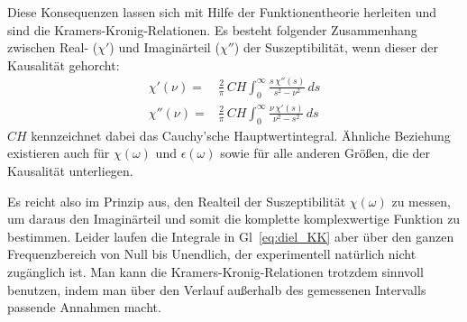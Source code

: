 Diese Konsequenzen lassen sich mit Hilfe der Funktionentheorie herleiten und sind die Kramers-Kronig-Relationen. Es besteht folgender Zusammenhang zwischen Real- ($\chi'$) und Imaginärteil  ($\chi''$) der Suszeptibilität, wenn dieser der Kausalität gehorcht:
\begin{align}
 \chi'(\nu) = & \frac{2}{\pi} \, CH \int_0^\infty \frac{s  \, \chi''(s)}{s^2 - \nu^2} \, ds \\
 \chi''(\nu) = & \frac{2}{\pi}\,  CH \int_0^\infty \frac{\nu \, \chi'(s)}{\nu^2 - s^2} \, ds 
 \label{eq:diel_KK}
\end{align}
$CH$ kennzeichnet dabei das Cauchy'sche Hauptwertintegral. Ähnliche Beziehung existieren auch für $\chi(\omega)$ und $\epsilon(\omega)$ sowie für alle anderen Größen, die der Kausalität unterliegen.

Es reicht also im Prinzip aus, den Realteil der Suszeptibilität $\chi(\omega)$ zu messen, um daraus den Imaginärteil und somit die komplette komplexwertige Funktion zu bestimmen. Leider laufen die Integrale in Gl~\ref{eq:diel_KK} aber über den ganzen Frequenzbereich von Null bis Unendlich, der experimentell natürlich nicht zugänglich ist. Man kann die Kramers-Kronig-Relationen trotzdem sinnvoll benutzen, indem man über den Verlauf außerhalb des gemessenen Intervalls passende Annahmen macht.




\printbibliography[segment=\therefsegment,heading=subbibliography]
